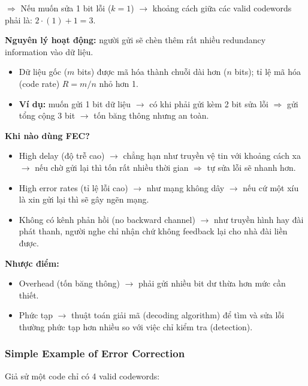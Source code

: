 \noindent
$\Rightarrow$ Nếu muốn sửa 1 bit lỗi ($k=1$) $\rightarrow$ khoảng cách giữa các valid codewords phải là: $2 \cdot (1) + 1 = 3$.
\medskip

\noindent
\textbf{Nguyên lý hoạt động:} người gửi sẽ chèn thêm rất nhiều redundancy information vào dữ liệu.

\begin{itemize}
    \item Dữ liệu gốc ($m$ bits) được mã hóa thành chuỗi dài hơn ($n$ bits); tỉ lệ mã hóa (code rate) $R = m/n$ nhỏ hơn 1.
    \item \textbf{Ví dụ:} muốn gửi 1 bit dữ liệu $\rightarrow$ có khi phải gửi kèm 2 bit sửa lỗi $\Rightarrow$ gửi tổng cộng 3 bit $\rightarrow$ tốn băng thông nhưng an toàn.
\end{itemize}
\medskip

\noindent
\textbf{Khi nào dùng FEC?}

\begin{itemize}
    \item High delay (độ trễ cao) $\rightarrow$ chẳng hạn như truyền vệ tin với khoảng cách xa $\rightarrow$ nếu chờ gửi lại thì tốn rất nhiều thời gian $\Rightarrow$ tự sửa lỗi sẽ nhanh hơn.
    \item High error rates (tỉ lệ lỗi cao) $\rightarrow$ như mạng không dây $\rightarrow$ nếu cứ một xíu là xin gửi lại thì sẽ gây ngẽn mạng.
    \item Không có kênh phản hồi (no backward channel) $\rightarrow$ như truyền hình hay đài phát thanh, người nghe chỉ nhận chứ không feedback lại cho nhà đài liền được.
\end{itemize}
\medskip

\noindent
\textbf{Nhược điểm:}

\begin{itemize}
    \item Overhead (tốn băng thông) $\rightarrow$ phải gửi nhiều bit dư thừa hơn mức cần thiết.
    \item Phức tạp $\rightarrow$ thuật toán giải mã (decoding algorithm) để tìm và sửa lỗi thường phức tạp hơn nhiều so với việc chỉ kiểm tra (detection).
\end{itemize}
\medskip

\subsubsection{Simple Example of Error Correction}

\noindent
Giả sử một code chỉ có 4 valid codewords:

